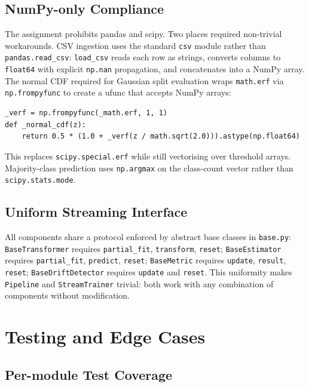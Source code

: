 \documentclass[10pt,a4paper]{article}
\begin{document}
\subsection{NumPy-only Compliance}

The assignment prohibits pandas and scipy. Two places required non-trivial workarounds. CSV ingestion uses the standard \texttt{csv} module rather than \texttt{pandas.read\_csv}: \texttt{load\_csv} reads each row as strings, converts columns to \texttt{float64} with explicit \texttt{np.nan} propagation, and concatenates into a NumPy array. The normal CDF required for Gaussian split evaluation wraps \texttt{math.erf} via \texttt{np.frompyfunc} to create a ufunc that accepts NumPy arrays:

\begin{lstlisting}
_verf = np.frompyfunc(_math.erf, 1, 1)
def _normal_cdf(z):
    return 0.5 * (1.0 + _verf(z / math.sqrt(2.0))).astype(np.float64)
\end{lstlisting}

This replaces \texttt{scipy.special.erf} while still vectorising over threshold arrays. Majority-class prediction uses \texttt{np.argmax} on the class-count vector rather than \texttt{scipy.stats.mode}.

\subsection{Uniform Streaming Interface}

All components share a protocol enforced by abstract base classes in \texttt{base.py}: \texttt{BaseTransformer} requires \texttt{partial\_fit}, \texttt{transform}, \texttt{reset}; \texttt{BaseEstimator} requires \texttt{partial\_fit}, \texttt{predict}, \texttt{reset}; \texttt{BaseMetric} requires \texttt{update}, \texttt{result}, \texttt{reset}; \texttt{BaseDriftDetector} requires \texttt{update} and \texttt{reset}. This uniformity makes \texttt{Pipeline} and \texttt{StreamTrainer} trivial: both work with any combination of components without modification.

\section{Testing and Edge Cases}

\subsection{Per-module Test Coverage}
\end{document}
